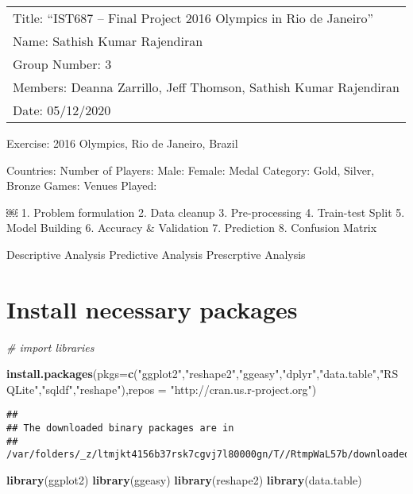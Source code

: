 \documentclass[]{article}
\author{}
\date{\vspace{-2.5em}}
\newenvironment{Shaded}{\begin{snugshade}}{\end{snugshade}}
\newcommand{\CommentTok}[1]{\textcolor[rgb]{0.56,0.35,0.01}{\textit{#1}}}
\newcommand{\DataTypeTok}[1]{\textcolor[rgb]{0.13,0.29,0.53}{#1}}
\newcommand{\KeywordTok}[1]{\textcolor[rgb]{0.13,0.29,0.53}{\textbf{#1}}}
\newcommand{\NormalTok}[1]{#1}
\newcommand{\StringTok}[1]{\textcolor[rgb]{0.31,0.60,0.02}{#1}}
\begin{document}
\begin{longtable}[]{@{}l@{}}
\toprule
\endhead
Title: ``IST687 -- Final Project \textbar{} 2016 Olympics in Rio de
Janeiro''\tabularnewline
Name: Sathish Kumar Rajendiran\tabularnewline
Group Number: 3\tabularnewline
Members: Deanna Zarrillo, Jeff Thomson, Sathish Kumar
Rajendiran\tabularnewline
Date: 05/12/2020\tabularnewline
\bottomrule
\end{longtable}

Exercise: 2016 Olympics, Rio de Janeiro, Brazil

Countries: Number of Players: Male: Female: Medal Category: Gold,
Silver, Bronze Games: Venues Played:

￼ 1. Problem formulation 2. Data cleanup 3. Pre-processing 4. Train-test
Split 5. Model Building 6. Accuracy \& Validation 7. Prediction 8.
Confusion Matrix

Descriptive Analysis Predictive Analysis Prescrptive Analysis

\hypertarget{install-necessary-packages}{%
\section{Install necessary packages}\label{install-necessary-packages}}

\begin{Shaded}
\begin{Highlighting}[]
\CommentTok{# import libraries}

\KeywordTok{install.packages}\NormalTok{(}\DataTypeTok{pkgs=}\KeywordTok{c}\NormalTok{(}\StringTok{"ggplot2"}\NormalTok{,}\StringTok{"reshape2"}\NormalTok{,}\StringTok{"ggeasy"}\NormalTok{,}\StringTok{"dplyr"}\NormalTok{,}\StringTok{"data.table"}\NormalTok{,}\StringTok{"RSQLite"}\NormalTok{,}\StringTok{"sqldf"}\NormalTok{,}\StringTok{"reshape"}\NormalTok{),}\DataTypeTok{repos =} \StringTok{"http://cran.us.r-project.org"}\NormalTok{)}
\end{Highlighting}
\end{Shaded}

\begin{verbatim}
## 
## The downloaded binary packages are in
##  /var/folders/_z/ltmjkt4156b37rsk7cgvj7l80000gn/T//RtmpWaL57b/downloaded_packages
\end{verbatim}

\begin{Shaded}
\begin{Highlighting}[]
\KeywordTok{library}\NormalTok{(ggplot2)}
\KeywordTok{library}\NormalTok{(ggeasy)}
\KeywordTok{library}\NormalTok{(reshape2)}
\KeywordTok{library}\NormalTok{(data.table)}
\end{Highlighting}
\end{Shaded}
\end{document}
